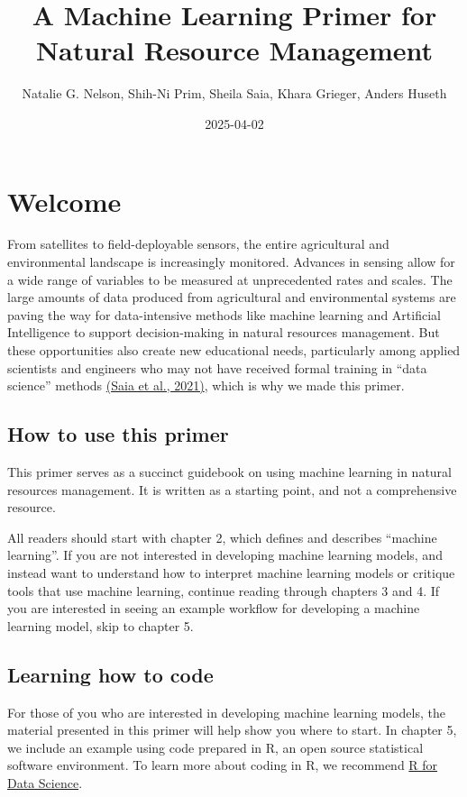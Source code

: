 \documentclass[
]{book}
\title{A Machine Learning Primer for Natural Resource Management}
\author{Natalie G. Nelson, Shih-Ni Prim, Sheila Saia, Khara Grieger, Anders Huseth}
\date{2025-04-02}
\begin{document}
\maketitle

{
\setcounter{tocdepth}{1}
\tableofcontents
}
\hypertarget{welcome}{%
\chapter{Welcome}\label{welcome}}

From satellites to field-deployable sensors, the entire agricultural and environmental landscape is increasingly monitored. Advances in sensing allow for a wide range of variables to be measured at unprecedented rates and scales. The large amounts of data produced from agricultural and environmental systems are paving the way for data-intensive methods like machine learning and Artificial Intelligence to support decision-making in natural resources management. But these opportunities also create new educational needs, particularly among applied scientists and engineers who may not have received formal training in ``data science'' methods \href{https://doi.org/10.1016/j.ecolmodel.2020.109257}{(Saia et al., 2021)}, which is why we made this primer.

\hypertarget{how-to-use-this-primer}{%
\section{How to use this primer}\label{how-to-use-this-primer}}

This primer serves as a succinct guidebook on using machine learning in natural resources management. It is written as a starting point, and not a comprehensive resource.

All readers should start with chapter 2, which defines and describes ``machine learning''. If you are not interested in developing machine learning models, and instead want to understand how to interpret machine learning models or critique tools that use machine learning, continue reading through chapters 3 and 4. If you are interested in seeing an example workflow for developing a machine learning model, skip to chapter 5.

\hypertarget{learning-how-to-code}{%
\section{Learning how to code}\label{learning-how-to-code}}

For those of you who are interested in developing machine learning models, the material presented in this primer will help show you where to start. In chapter 5, we include an example using code prepared in R, an open source statistical software environment. To learn more about coding in R, we recommend \href{http://r4ds.hadley.nz/}{R for Data Science}.
\end{document}
